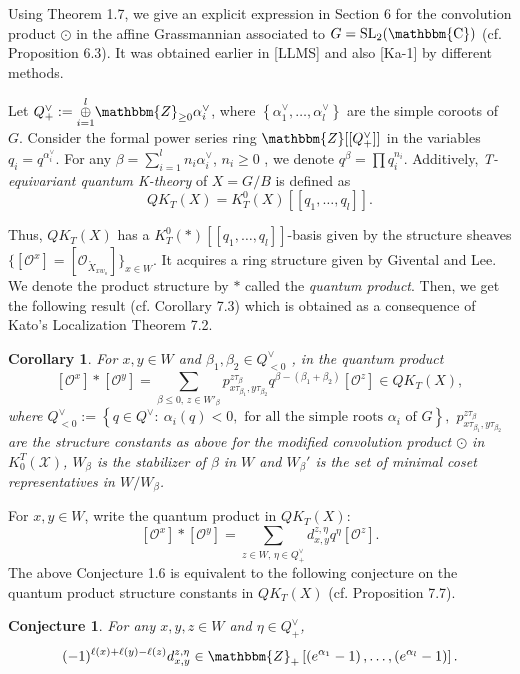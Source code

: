 \documentclass{article}
\newtheorem{conjecture}[theorem]{Conjecture}
\newtheorem{corollary}[theorem]{Corollary}
\def\X{\mathcal{X}}
\def\mathbb{\mathbbm}
\def\ref#1{#1}
\def\SL{\rm{SL}}
\begin{document}
Using Theorem \ref{1.7}, we give an explicit expression in Section 6 for the convolution product $\odot$ in the affine Grassmannian associated to $G=\SL_2(\mathbb{C})$ (cf. Proposition \ref{6.3}). It was  obtained earlier in [LLMS] and also [Ka-1] by different methods. 

Let $Q_+^\vee:= \underset{i=1}{\overset{l}{\oplus}} \mathbbm{Z}_{\geq0}\alpha_i^\vee$, where $\left\{\alpha_1^\vee,\ldots,\alpha_l^\vee\right\}$ are the simple coroots of $G$. Consider the formal power series ring $\mathbbm{Z} [[Q_+^\vee]]$ in the variables $q_i=q^{\alpha_i^\vee}$. For any $\beta=\sum_{i=1}^ln_i\alpha_i^\vee$, $n_i\geq 0$ , we denote $q^\beta=
\prod q_i^{n_i}$. 
Additively, \textit{T-equivariant quantum K-theory} of $X=G/B$ is defined as 
$$
Q K_T \left(X\right) = K_T^0 \left(X\right) [[ q_1, \ldots , q_l]].
$$

Thus, $QK_T(X)$ has a $K_T^0(*) [[q_1,\ldots,q_l]] $-basis given by the structure sheaves
$\{ \left[ \mathcal{O}^x\right] = [ \mathcal{O}_{\mathring{X}_{xw_o}}]\}_{x\in W}$.  
It acquires a ring structure given by Givental  and Lee. We denote the product structure by $*$ called the \textit{quantum product}.
Then, we get the following result (cf. Corollary \ref{7.3}) which is obtained 
as a consequence of Kato's Localization Theorem \ref{7.2}. 
 \begin{corollary} \label{1.9}For $x,y \in W$ and $\beta_1, \beta_2 \in Q_{<0}^\vee $ , in the quantum product
$$
\left[ \mathcal{O}^x\right] * \left[ \mathcal{O}^y\right] = \sum_{\beta\leq 0, \, z\in W'_\beta} p_{x\tau_{\beta_1},y \tau_{\beta_2}}^{z\tau_\beta}  q^{\beta- \left( \beta_1+\beta_2\right)} \left[\mathcal{O}^z\right] \in QK_T(X),
$$
where $Q_{<0}^\vee := \left\{ q\in Q^\vee:~ \alpha_i (q) <0, \mbox{ for all the simple roots $\alpha_i$ of $G$}\right\},$
$p_{x\tau_{\beta_1},y \tau_{\beta_2}}^{z\tau_\beta}$ are the structure constants as above for the modified convolution product $\odot$ in $K_0^T \left(\X\right)$, $W_\beta $ is the stabilizer of $\beta $ in $W$ and $W_\beta'$ is the set of minimal coset representatives in $W/W_\beta$.  
\end{corollary}
For $x,y\in W$, write the quantum product in $QK_T(X)$: 
$$
 \left[ \mathcal{O}^x\right] *\left[ \mathcal{O}^y\right] = \sum_{z\in W, \, \eta \in Q_+^\vee} d_{x,y}^{z,\eta} q^\eta \left[\mathcal{O}^{z}\right].
$$
The above  Conjecture \ref{1.6} is equivalent to the following conjecture on the quantum product structure constants in $QK_T(X)$ (cf. Proposition \ref{7.7}). 
\begin{conjecture}\label{1.10}
For any $x,y, z \in W$ and $\eta \in Q_+^\vee$, 
$$
(-1)^{\ell(x)+\ell(y)-\ell(z)} d^{z,\eta}_{x,y} \in \mathbbm{Z}_+\left[ \left(e^{\alpha_1}-1\right),\ldots , \left(e^{\alpha_l}-1\right)\right].
$$
\end{conjecture}
\end{document}
